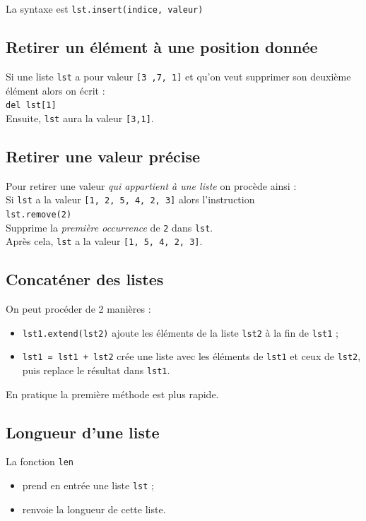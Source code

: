 La syntaxe est \texttt{lst.insert(indice, valeur)}
\subsection{Retirer un élément à une position donnée}
Si une liste \texttt{lst} a pour valeur \texttt{[3 ,7, 1]} et qu'on veut supprimer son deuxième élément alors on écrit :\\

\texttt{del lst[1]}\\

Ensuite, \texttt{lst} aura la valeur \texttt{[3,1]}.

\subsection{Retirer une valeur précise}
Pour retirer une valeur \textit{qui appartient à une liste} on procède ainsi :\\

Si \texttt{lst} a la valeur \texttt{[1, 2, 5, 4, 2, 3]} alors l'instruction \\

\texttt{lst.remove(2)}\\

Supprime la \textit{première occurrence} de \texttt{2} dans \texttt{lst}.\\
Après cela, \texttt{lst} a la valeur \texttt{[1, 5, 4, 2, 3]}.


\subsection{Concaténer des listes}
On peut procéder de 2 manières :
\begin{itemize}
	\item \texttt{lst1.extend(lst2)} ajoute les éléments de la liste \texttt{lst2} à la fin de \texttt{lst1} ;
	\item \texttt{lst1 = lst1 + lst2} crée une liste avec les éléments de \texttt{lst1} et ceux de \texttt{lst2}, puis replace le résultat dans \texttt{lst1}.
\end{itemize}
En pratique la première méthode est plus rapide.


\subsection{Longueur d'une liste}
La fonction \texttt{len}
\begin{itemize}
	\item prend en entrée une liste \texttt{lst} ;
	\item renvoie la longueur de cette liste.
\end{itemize}


